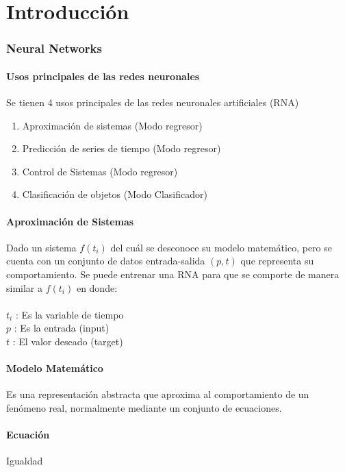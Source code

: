 \documentclass{article}
\begin{document}
\maketitle
\part{Introducción}
\section{Neural Networks}

\subsection{Usos principales de las redes neuronales}

Se tienen 4 usos principales de las redes neuronales artificiales (RNA)
\begin{enumerate}
	\item Aproximación de sistemas (Modo regresor)
	\item Predicción de series de tiempo (Modo regresor)
	\item Control de Sistemas (Modo regresor)
	\item Clasificación de objetos (Modo Clasificador)
\end{enumerate}
\subsection{Aproximación de Sistemas}
Dado un sistema $f(t_i)$ del cuál se desconoce su modelo matemático, pero se cuenta con un conjunto de datos entrada-salida $(p, t)$ que representa su comportamiento. Se puede entrenar una RNA para que se comporte de manera similar a $f(t_i)$ en donde:\\\\
$t_i$ : Es la variable de tiempo\\
$p$ : Es la entrada (input)\\
$t$ : El valor deseado (target)\\

\subsection{Modelo Matemático}
Es una representación abstracta que aproxima al comportamiento de un fenómeno real, normalmente mediante un conjunto de ecuaciones.

\subsection{Ecuación}
Igualdad
\end{document}
